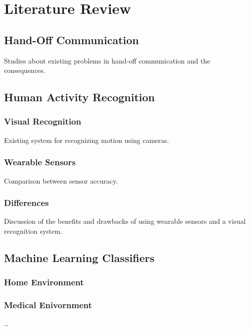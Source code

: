 
\chapter{Literature Review}
\label{ch:Literature-Review}

\section{Hand-Off Communication}
\label{sec:Literature-Review:Hand-Off Communication}
Studies about existing problems in hand-off communication and the consequences.

\section{Human Activity Recognition}
\label{sec:Literature-Review:Human-Activity-Recognition}

\subsection{Visual Recognition}
Existing system for recognizing motion using cameras.

\subsection{Wearable Sensors}
Comparison between sensor accuracy.

\subsection{Differences}
Discussion of the benefits and drawbacks of using wearable sensors and a visual recognition system.

\section{Machine Learning Classifiers}
\label{sec:Literature-Review:Machine-Learning-Classifiers}

\subsection{Home Environment}

\subsection{Medical Enivornment}

\dots